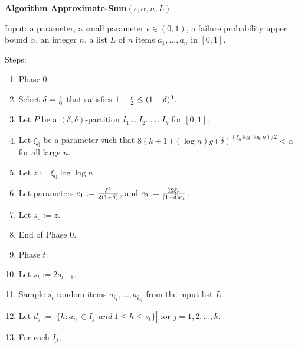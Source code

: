 \documentclass[runningheads]{llncs}
\begin{document}
\vskip 10pt





 {\bf Algorithm Approximate-Sum$(\epsilon,  \alpha, n, L)$}


Input: a parameter, a small parameter $\epsilon\in (0,1)$, a failure
probability upper bound $\alpha$, an integer $n$, a list $L$ of $n$
items $a_1,\ldots , a_n$ in $[0,1]$.




Steps:


\begin{enumerate}[1.]

\item
Phase $0$:
\item\label{parameters-phase0}
\qquad Select $\delta={\epsilon\over 6}$  that satisfies
$1-{\epsilon\over 2}\le (1-\delta)^3$.

\item
\qquad Let $P$ be a $(\delta,\delta)$-partition $I_1\cup I_2\ldots
\cup I_k$ for $[0,1]$.

\item\label{xi0-setting}
\qquad Let $\xi_0$ be a parameter such that $8(k+1)(\log n)
g(\delta)^{(\xi_0\log \log n)/2}<\alpha$ for all large $n$.

\item\label{first-alpha-setting}
\qquad Let $z:=\xi_0\log \log n$.

\item\label{constant-setting-in-Approximate-Intervals}
\qquad Let parameters $c_1:={\delta^2\over 2(1+\delta)}$, and
$c_2:={12\xi_0\over (1-\delta) c_1}$.


\item
\qquad Let $s_0:=z$.

\item
End of Phase $0$.

\item
Phase $t$:



\item\label{loop-m-start}
\qquad Let $s_t:=2s_{t-1}$.

\item
\qquad Sample $s_t$ random items $a_{i_1},\ldots , a_{i_{s_t}}$ from
the input list $L$.

\item
\qquad Let $d_j:=|\{h: a_{i_h}\in I_j\ \ and \ 1\le h\le s_t\}|$ for
$j=1,2,\ldots , k$.




\item\label{I-j-loop}
\qquad For each $I_j$,


\end{enumerate}
\end{document}
